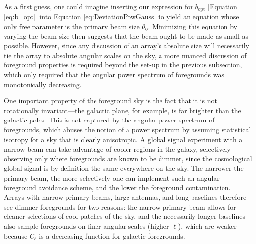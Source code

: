 \documentclass[twolcolumn,apj,iop,numberedappendix]{emulateapj}
\begin{document}
As a first guess, one could imagine inserting our expression for $b_\textrm{opt}$ [Equation \eqref{eq:b_opt}] into Equation \eqref{eq:DeviationPowGauss} to yield an equation whose only free parameter is the primary beam size $\theta_0$. Minimizing this equation by varying the beam size then suggests that the beam ought to be made as small as possible. However, since any discussion of an array's absolute size will necessarily tie the array to absolute angular scales on the sky, a more nuanced discussion of foreground properties is required beyond the set-up in the previous subsection, which only required that the angular power spectrum of foregrounds was monotonically decreasing.

One important property of the foreground sky is the fact that it is not rotationally invariant---the galactic plane, for example, is far brighter than the galactic poles. This is not captured by the angular power spectrum of foregrounds, which abuses the notion of a power spectrum by assuming statistical isotropy for a sky that is clearly anisotropic. A global signal experiment with a narrow beam can take advantage of cooler regions in the galaxy, selectively observing only where foregrounds are known to be dimmer, since the cosmological global signal is by definition the same everywhere on the sky. The narrower the primary beam, the more selectively one can implement such an angular foreground avoidance scheme, and the lower the foreground contamination. Arrays with narrow primary beams, large antennas, and long baselines therefore see dimmer foregrounds for two reasons: the narrow primary beam allows for cleaner selections of cool patches of the sky, and the necessarily longer baselines also sample foregrounds on finer angular scales (higher $\ell$), which are weaker because $C_\ell$ is a decreasing function for galactic foregrounds.
\end{document}
